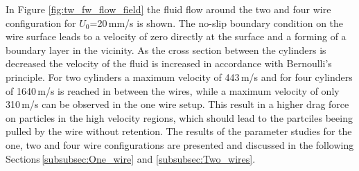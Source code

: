 In Figure \ref{fig:tw_fw_flow_field} the fluid flow around the two and four wire configuration for $U_{0}$=20\,mm/s is shown. The no-slip boundary condition on the wire surface leads to a velocity of zero directly at the surface and a forming of a boundary layer in the vicinity. As the cross section between the cylinders is decreased the velocity of the fluid is increased in accordance with Bernoulli's principle. For two cylinders a maximum velocity of 443\,\textmu m/s and for four cylinders of 1640\,\textmu m/s is reached in between the wires, while a maximum velocity of only 310\,\textmu m/s can be observed in the one wire setup. This result in a higher drag force on particles in the high velocity regions, which should lead to the partciles beeing pulled by the wire without retention.   
The results of the parameter studies for the one, two and four wire configurations are presented and discussed in the following Sections\,\ref{subsubsec:One_wire} and \ref{subsubsec:Two_wires}. 
\FloatBarrier

% 



